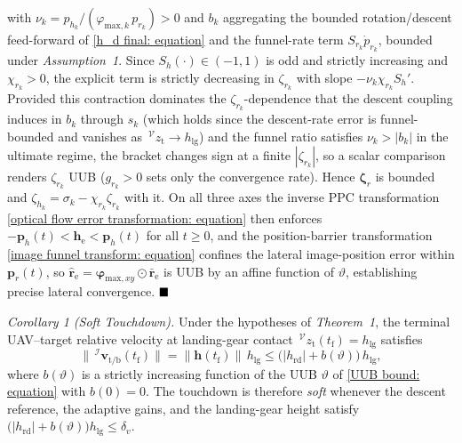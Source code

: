 \documentclass{IEEEtaes}
\begin{document}
with $\nu_k=p_{h_k}/(\varphi_{\text{max},k}\,p_{r_k})>0$ and $b_k$ aggregating the bounded rotation/descent feed-forward of \eqref{h_d final: equation} and the funnel-rate term $S_{r_k}\dot{p}_{r_k}$, bounded under \textit{Assumption~1}. Since $S_h(\cdot)\in(-1,1)$ is odd and strictly increasing and $\chi_{r_k}>0$, the explicit term is strictly decreasing in $\zeta_{r_k}$ with slope $-\nu_k\chi_{r_k}S_h'$. Provided this contraction dominates the $\zeta_{r_k}$-dependence that the descent coupling induces in $b_k$ through $s_k$ (which holds since the descent-rate error is funnel-bounded and vanishes as $\,^\mathcal{V}z_\text{t}\to h_\text{lg}$) and the funnel ratio satisfies $\nu_k>|b_k|$ in the ultimate regime, the bracket changes sign at a finite $|\zeta_{r_k}|$, so a scalar comparison renders $\zeta_{r_k}$ UUB ($g_{r_k}>0$ sets only the convergence rate). Hence $\boldsymbol{\zeta}_r$ is bounded and $\zeta_{h_k}=\sigma_k-\chi_{r_k}\zeta_{r_k}$ with it. On all three axes the inverse PPC transformation \eqref{optical flow error transformation: equation} then enforces $-\boldsymbol{p}_h(t)<\boldsymbol{h}_\text{e}<\boldsymbol{p}_h(t)$ for all $t\ge 0$, and the position-barrier transformation \eqref{image funnel transform: equation} confines the lateral image-position error within $\boldsymbol{p}_r(t)$, so $\hat{\boldsymbol{r}}_\text{e}=\boldsymbol{\varphi}_{\text{max},xy}\odot\bar{\boldsymbol{r}}_\text{e}$ is UUB by an affine function of $\vartheta$, establishing precise lateral convergence. $\hfill\blacksquare$

\textit{Corollary 1 (Soft Touchdown).} Under the hypotheses of \textit{Theorem~1}, the terminal UAV--target relative velocity at landing-gear contact $\,^\mathcal{V}z_\text{t}(t_\text{f})=h_\text{lg}$ satisfies
\begin{equation} \label{soft touchdown bound: equation}
    \|\,^\mathcal{I}\boldsymbol{v}_{\text{t/b}}(t_\text{f})\| = \|\boldsymbol{h}(t_\text{f})\|\,h_\text{lg} \le \big(|h_\text{rd}| + b(\vartheta)\big)\,h_\text{lg},
\end{equation}
where $b(\vartheta)$ is a strictly increasing function of the UUB $\vartheta$ of \eqref{UUB bound: equation} with $b(0)=0$. The touchdown is therefore \emph{soft} whenever the descent reference, the adaptive gains, and the landing-gear height satisfy $\big(|h_\text{rd}|+b(\vartheta)\big)h_\text{lg}\le\delta_v$.
\end{document}
